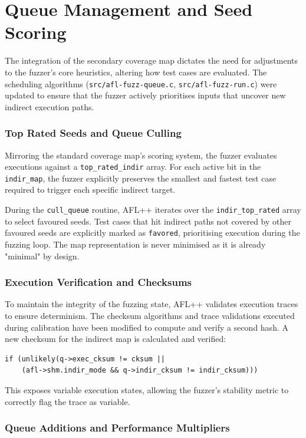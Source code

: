 \section{Queue Management and Seed Scoring}

The integration of the secondary coverage map dictates the need for adjustments to the fuzzer's core heuristics, altering how test cases are evaluated. The scheduling algorithms (\texttt{src/afl-fuzz-queue.c}, \texttt{src/afl-fuzz-run.c}) were updated to ensure that the fuzzer actively prioritises inputs that uncover new indirect execution paths.

\subsubsection{Top Rated Seeds and Queue Culling}

Mirroring the standard coverage map's scoring system, the fuzzer evaluates executions against a \texttt{top\_rated\_indir} array. For each active bit in the \texttt{indir\_map}, the fuzzer explicitly preserves the smallest and fastest test case required to trigger each specific indirect target.

During the \texttt{cull\_queue} routine, AFL++ iterates over the \texttt{indir\_top\_rated} array to select favoured seeds. Test cases that hit indirect paths not covered by other favoured seeds are explicitly marked as \texttt{favored}, prioritising execution during the fuzzing loop. The map representation is never minimised as it is already "minimal" by design.

\subsubsection{Execution Verification and Checksums}

To maintain the integrity of the fuzzing state, AFL++ validates execution traces to ensure determinism. The checksum algorithms and trace validations executed during calibration have been modified to compute and verify a second hash. A new checksum for the indirect map is calculated and verified:
\begin{verbatim}
if (unlikely(q->exec_cksum != cksum || 
    (afl->shm.indir_mode && q->indir_cksum != indir_cksum))) 
\end{verbatim}
This exposes variable execution states, allowing the fuzzer's stability metric to correctly flag the trace as variable.

\subsubsection{Queue Additions and Performance Multipliers}

